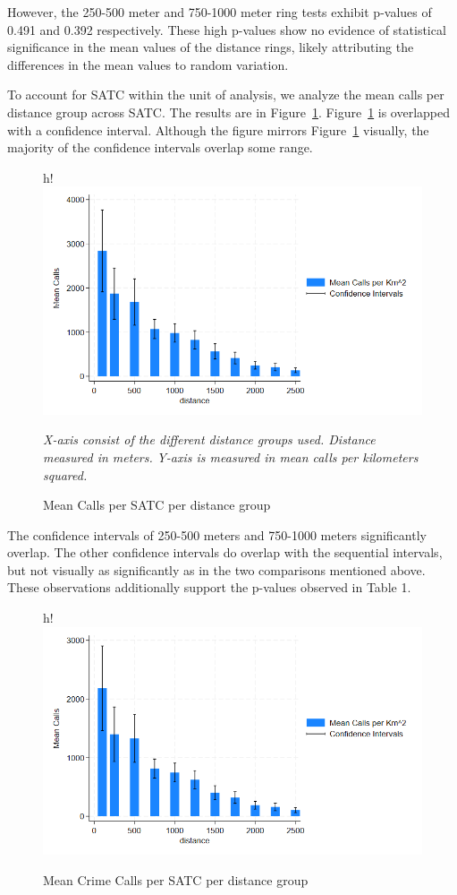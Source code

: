 \documentclass[12pt]{article}
\begin{document}
However, the 250-500 meter and 750-1000 meter ring tests exhibit p-values of 0.491 and 0.392 respectively. These high p-values show no evidence of statistical significance in the mean values of the distance rings, likely attributing the differences in the mean values to random variation.

To account for SATC within the unit of analysis, we analyze the mean calls per distance group across SATC. The results are in Figure~\ref{fig:Figure1}. Figure~\ref{fig:Figure1} is overlapped with a confidence interval. Although the figure mirrors Figure~\ref{fig:Figure1} visually, the majority of the confidence intervals overlap some range. 
\begin{figure}{h!}
    \centering
\includegraphics[width=0.75\linewidth]{CI_Graph.png}
    \caption{Mean Calls per SATC per distance group}
    \label{fig:Figure1}
     \textit{X-axis consist of the different distance groups used. Distance measured in meters.}
    \textit{Y-axis is measured in mean calls per kilometers squared.}
\end{figure}
The confidence intervals of 250-500 meters and 750-1000 meters significantly overlap. The other confidence intervals do overlap with the sequential intervals, but not visually as significantly as in the two comparisons mentioned above. These observations additionally support the p-values observed in Table 1. 

\begin{figure}{h!}
    \centering
\includegraphics[width=0.75\linewidth]{Crim_CI_Graph.png}
    \caption{Mean Crime Calls per SATC per distance group}
    \label{fig:Figure2}
\end{figure}
\end{document}
